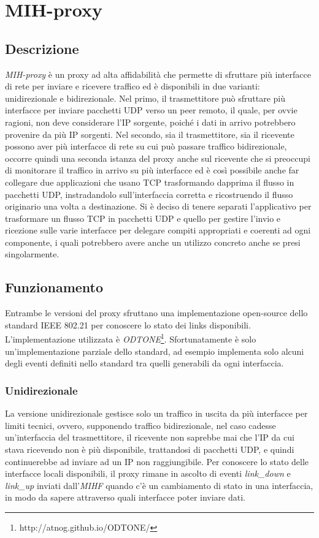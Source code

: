 \chapter{MIH-proxy}
\section{Descrizione}
{\em MIH-proxy} è un proxy ad alta affidabilità che permette di sfruttare più interfacce di rete per inviare e ricevere traffico ed è disponibili in due varianti: unidirezionale e bidirezionale. Nel primo, il trasmettitore può sfruttare più interfacce per inviare pacchetti UDP verso un peer remoto, il quale, per ovvie ragioni, non deve considerare l'IP sorgente, poiché i dati in arrivo potrebbero provenire da più IP sorgenti. Nel secondo, sia il trasmettitore, sia il ricevente possono aver più interfacce di rete su cui può passare traffico bidirezionale, occorre quindi una seconda istanza del proxy anche sul ricevente che si preoccupi di monitorare il traffico in arrivo su più interfacce ed è così possibile anche far collegare due applicazioni che usano TCP trasformando dapprima il flusso in pacchetti UDP, instradandolo sull'interfaccia corretta e ricostruendo il flusso originario una volta a destinazione. Si è deciso di tenere separati l'applicativo per trasformare un flusso TCP in pacchetti UDP e quello per gestire l'invio e ricezione sulle varie interfacce per delegare compiti appropriati e coerenti ad ogni componente, i quali potrebbero avere anche un utilizzo concreto anche se presi singolarmente.
\section{Funzionamento}
Entrambe le versioni del proxy sfruttano una implementazione open-source dello standard IEEE 802.21 per conoscere lo stato dei links disponibili. L'implementazione utilizzata è {\em ODTONE}\footnote{http://atnog.github.io/ODTONE/}. Sfortunatamente è solo un'implementazione parziale dello standard, ad esempio implementa solo alcuni degli eventi definiti nello standard tra quelli generabili da ogni interfaccia. 
\subsection{Unidirezionale}
La versione unidirezionale gestisce solo un traffico in uscita da più interfacce per limiti tecnici, ovvero, supponendo traffico bidirezionale, nel caso cadesse un'interfaccia del trasmettitore, il ricevente non saprebbe mai che l'IP da cui stava ricevendo non è più disponibile, trattandosi di pacchetti UDP, e quindi continuerebbe ad inviare ad un IP non raggiungibile. Per conoscere lo stato delle interfacce locali disponibili, il proxy rimane in ascolto di eventi {\em link\_down} e {\em link\_up} inviati dall'{\em MIHF} quando c'è un cambiamento di stato in una interfaccia, in modo da sapere attraverso quali interfacce poter inviare dati. 
